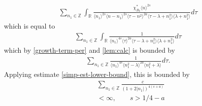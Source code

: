 \documentclass[12pt,reqno]{amsart}
\numberwithin{equation}{section}  %
\numberwithin{figure}{section}
\newcommand{\rr}{\mathbb{R}}
\newcommand{\zz}{\mathbb{Z}}
\theoremstyle{plain}
\theoremstyle{definition}
\theoremstyle{remark}
\begin{document}
\begin{equation*}
\begin{split}
  \sum_{n_{1} \in \zz} \int_{\rr} \frac{\chi^{*}_{B_{3}}
    \langle n \rangle ^{2s}
    }{ \langle n_{1} \rangle^{2s} \langle
    n-n_{1} \rangle ^{2s} \langle \tau - n^{2}    \rangle ^{2a}
    \langle \tau - \lambda + n_{1}^{2} \rangle
    \langle  \lambda + n_{1}^{2} \rangle  } d \tau  
\end{split}
\end{equation*}
which is equal to
\begin{equation*}
\begin{split}
  \sum_{n_{1} \in \zz} \int_{\rr} \frac{1}
    { \langle n_{1} \rangle^{4s} \langle \tau    \rangle ^{2a}
    \langle \tau - \lambda + n_{1}^{2} \rangle
    \langle  \lambda + n_{1}^{2} \rangle  } d \tau  
\end{split}
\end{equation*}
which by \eqref{growth-term-per} and \autoref{lem:calc} is bounded by
%
%
\begin{equation*}
\begin{split}
  \sum_{n_{1} \in \zz} \frac{1}
  { \langle n_{1} \rangle^{4s} \langle n_{1}^{2} - \lambda   \rangle ^{2a}
  \langle n_{1}^{2} + \lambda \rangle
     } d \tau  .
\end{split}
\end{equation*}
%
%
Applying estimate \eqref{simp-est-lower-bound}, this is bounded by
\begin{equation*}
\begin{split}
  & \sum_{n_{1} \in \zz} \frac{c}
  { ( 1 + 2 |n_{1} | )^{4(s+a)}} 
  \\
  & < \infty, \qquad s > 1/4 -a 
\end{split}
\end{equation*}
\end{document}
